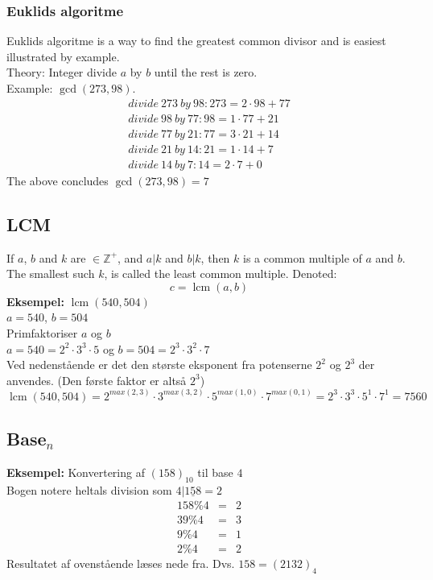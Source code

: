 \documentclass[a4paper]{article}
\newcommand{\Integers}{\mathbb{Z}}
\begin{document}
    \subsubsection{Euklids algoritme}
     Euklids algoritme is a way to find the greatest common divisor and is easiest illustrated by example.\\
     Theory: Integer divide $a$ by $b$ until the rest is zero.\\
     Example: $\operatorname{gcd}(273, 98)$.%
     \begin{eqnarray}
      divide\ 273\ by\ 98:	273 = 2 \cdot 98 + 77\\
      divide\ 98\ by\ 77:	98 = 1 \cdot 77 + 21\\
      divide\ 77\ by\ 21:	77 = 3 \cdot 21 + 14\\
      divide\ 21\ by\ 14:	21 = 1 \cdot 14 + 7\\
      divide\ 14\ by\ 7:	14 = 2 \cdot 7 + 0
     \end{eqnarray}
     The above concludes $\operatorname{gcd}(273, 98) = 7$
  \subsection{LCM}
   If $a$, $b$ and $k$ are $\in \Integers^+$, and $a | k$ and $b | k$, then $k$ is a common multiple of $a$ and $b$. The smallest such $k$, is called the least common multiple. Denoted:
    $$c = \operatorname{lcm}(a, b)$$
    \textbf{Eksempel:} $\operatorname{lcm}(540, 504)$\\
    $a = 540$, $b = 504$\\
    Primfaktoriser $a$ og $b$\\
    $a = 540 = 2^2 \cdot 3^3 \cdot 5$ og $b = 504 = 2^3 \cdot 3^2 \cdot 7$\\
    Ved nedenstående er det den største eksponent fra potenserne $2^2$ og $2^3$ der anvendes. (Den første faktor er altså $2^3$)\\
    $\operatorname{lcm}(540, 504) = 2^{max(2, 3)} \cdot 3^{max(3, 2)} \cdot 5^{max(1, 0)} \cdot 7^{max(0, 1)} = 2^3 \cdot 3^3 \cdot 5^1 \cdot 7^1 = 7560$


  \subsection{Base$_n$}
   
   \textbf{Eksempel:} Konvertering af $(158)_{10}$ til base $4$\\
   Bogen notere heltals division som $4|\underline{158} = 2$\\
   \begin{eqnarray}
    158 \% 4 &=& 2 \nonumber\\
    39 \% 4 &=& 3 \nonumber\\
    9 \% 4 &=& 1 \nonumber\\
    2 \% 4 &=& 2 \nonumber
   \end{eqnarray}
   Resultatet af ovenstående læses nede fra. Dvs. $158 = (2132)_4$
\end{document}
